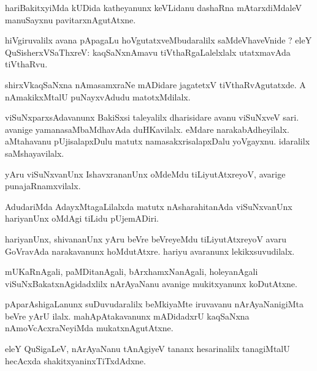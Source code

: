 \documentclass{article}
\begin{document}
\begin{mn}
hariBakitxyiMda kUDida katheyanunx keVLidanu dashaRna mAtarxdiMdaleV manuSayxnu pavitarxnAgutAtxne.
\end{mn}

\begin{mn}
hiVgiruvalilx avana pApagaLu hoVgutatxveMbudaralilx saMdeVhaveVnide ? eleY QuSisherxVSaThxreV: 
kaqSaNxnAmavu tiVthaRgaLalelxlalx utatxmavAda tiVthaRvu.
\end{mn}

\begin{mn}
shirxVkaqSaNxna nAmasamxraNe mADidare jagatetxV tiVthaRvAgutatxde. A nAmakikxMtalU puNayxvAdudu 
matotxMdilalx.
\end{mn}

\begin{mn}
viSuNxparxsAdavanunx BakiSxsi taleyalilx  dharisidare avanu viSuNxveV sari. avanige 
yamanasaMbaMdhavAda duHKavilalx. eMdare narakabAdheyilalx. aMtahavanu pUjisalapxDulu matutx 
namasakxrisalapxDalu yoVgayxnu. idaralilx saMshayavilalx. 
\end{mn}

\begin{mn}
yAru viSuNxvanUnx IshavxrananUnx oMdeMdu tiLiyutAtxreyoV, avarige punajaRnamxvilalx.
\end{mn}

\begin{mn}
AdudariMda AdayxMtagaLilalxda matutx nAsharahitanAda viSuNxvanUnx hariyanUnx oMdAgi tiLidu 
pUjemADiri.
\end{mn}

\begin{mn}
hariyanUnx, shivananUnx yAru beVre beVreyeMdu tiLiyutAtxreyoV avaru GoVravAda narakavanunx 
hoMdutAtxre. hariyu avaranunx lekikxsuvudilalx.
\end{mn}

\begin{mn}
mUKaRnAgali, paMDitanAgali, bArxhamxNanAgali, holeyanAgali  viSuNxBakatxnAgidadxlilx nArAyaNanu 
avanige mukitxyanunx koDutAtxne.
\end{mn}

\begin{mn}
pAparAshigaLanunx suDuvudaralilx beMkiyaMte iruvavanu nArAyaNanigiMta beVre yArU ilalx. 
mahApAtakavanunx mADidadxrU kaqSaNxna nAmoVcAcxraNeyiMda mukatxnAgutAtxne.
\end{mn}

\begin{mn}
eleY QuSigaLeV, nArAyaNanu tAnAgiyeV tananx hesarinalilx tanagiMtalU hecAcxda 
shakitxyaninxTiTxdAdxne.
\end{mn}
\end{document}
